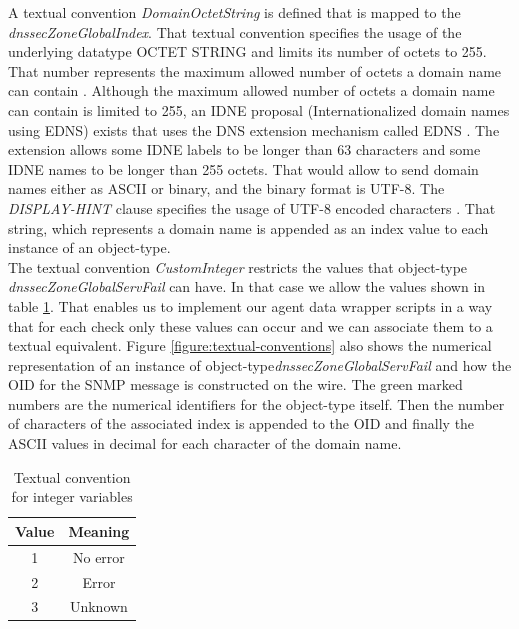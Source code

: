 A textual convention \textit{DomainOctetString} is defined that is mapped to the \textit{dnssecZoneGlobalIndex}. That textual convention specifies the usage of the underlying datatype OCTET STRING and limits its number of octets to 255. That number represents the maximum allowed number of octets a domain name can contain \cite{wiki-domainnames}. Although the maximum allowed number of octets a domain name can contain is limited to 255, an IDNE proposal \cite{idne} (Internationalized domain names using EDNS) exists that uses the DNS extension mechanism called EDNS \cite{edns}. The extension allows some IDNE labels to be longer than 63 characters and some IDNE names to be longer than 255 octets. That would allow to send domain names either as ASCII or binary, and the binary format is UTF-8. The \textit{DISPLAY-HINT} clause specifies the usage of UTF-8 encoded characters \cite{smi-tc}. That string, which represents a domain name is appended as an index value to each instance of an object-type.
\\ 
The textual convention \textit{CustomInteger} restricts the values that object-type \textit{dnssecZoneGlobalServFail} can have. In that case we allow the values shown in table \ref{table-tc}. That enables us to implement our agent data wrapper scripts in a way that for each check only these values can occur and we can associate them to a textual equivalent. Figure \ref{figure:textual-conventions} also shows the numerical representation of an instance of object-type\textit{dnssecZoneGlobalServFail} and how the OID for the SNMP message is constructed on the wire. The green marked numbers are the numerical identifiers for the object-type itself. Then the number of characters of the associated index is appended to the OID and finally the ASCII values in decimal for each character of the domain name. 

\begin{table}[h]
   \centering
  \begin{tabular}{|c|c|}
  \hline
  \textbf{Value} & \textbf{Meaning} \\
  \hline
  1 & No error \\
  \hline
  2 & Error \\
  \hline
  3 & Unknown \\
  \hline  
\end{tabular} 
\caption{Textual convention for integer variables }
\label{table-tc}
\end{table}
 